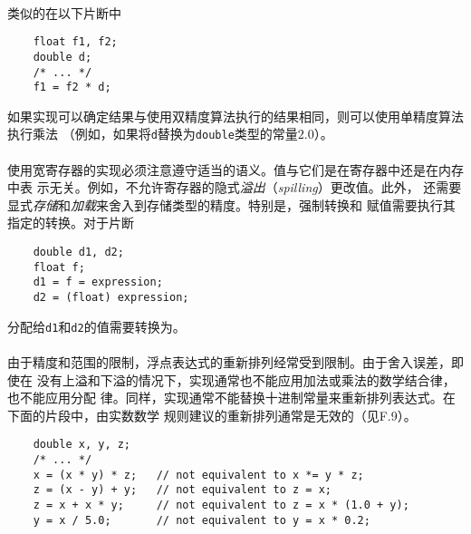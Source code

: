 \paragraph{}
\ex 类似的在以下片断中
\begin{lstlisting}
    float f1, f2;
    double d;
    /* ... */
    f1 = f2 * d;
\end{lstlisting}
如果实现可以确定结果与使用双精度算法执行的结果相同，则可以使用单精度算法执行乘法
（例如，如果将\texttt{d}替换为\texttt{double}类型的常量$2.0$）。

\paragraph{}
\ex 使用宽寄存器的实现必须注意遵守适当的语义。值与它们是在寄存器中还是在内存中表
示无关。例如，不允许寄存器的隐式\textit{溢出}（\textit{spilling}）更改值。此外，
还需要显式\textit{存储}和\textit{加载}来舍入到存储类型的精度。特别是，强制转换和
赋值需要执行其指定的转换。对于片断
\begin{lstlisting}
    double d1, d2;
    float f;
    d1 = f = expression;
    d2 = (float) expression;
\end{lstlisting}
分配给\texttt{d1}和\texttt{d2}的值需要转换为。

\paragraph{}
\ex 由于精度和范围的限制，浮点表达式的重新排列经常受到限制。由于舍入误差，即使在
没有上溢和下溢的情况下，实现通常也不能应用加法或乘法的数学结合律，也不能应用分配
律。同样，实现通常不能替换十进制常量来重新排列表达式。在下面的片段中，由实数数学
规则建议的重新排列通常是无效的（见F.9）。
\begin{lstlisting}
    double x, y, z;
    /* ... */
    x = (x * y) * z;   // not equivalent to x *= y * z;
    z = (x - y) + y;   // not equivalent to z = x;
    z = x + x * y;     // not equivalent to z = x * (1.0 + y);
    y = x / 5.0;       // not equivalent to y = x * 0.2;
\end{lstlisting}

